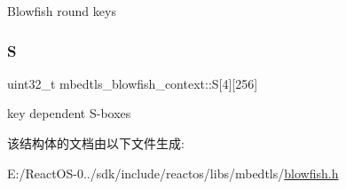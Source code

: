 Blowfish round keys \mbox{\label{structmbedtls__blowfish__context_ab366ec526d9d5303483ed9c5bbb6a049}} 
\subsubsection{\texorpdfstring{S}{S}}
{\footnotesize\ttfamily uint32\+\_\+t mbedtls\+\_\+blowfish\+\_\+context\+::S\mbox{[}4\mbox{]}\mbox{[}256\mbox{]}}

key dependent S-\/boxes 

该结构体的文档由以下文件生成\+:\begin{DoxyCompactItemize}
\item 
E\+:/\+React\+O\+S-\/0../sdk/include/reactos/libs/mbedtls/\hyperlink{blowfish_8h}{blowfish.\+h}\end{DoxyCompactItemize}
